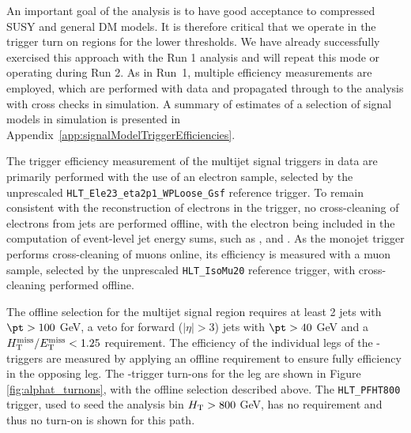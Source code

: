 An important goal of the analysis is to have good acceptance
to compressed SUSY and general DM models. It is therefore critical
that we operate in the trigger turn on regions for the lower
thresholds. We have already successfully exercised this approach with 
the Run 1 analysis and will repeat this mode or operating during Run 2.
As in Run~1, multiple efficiency measurements are
employed, which are performed with data and propagated through to the
analysis with cross checks in simulation. A summary of estimates of a 
selection of signal models in simulation is presented in Appendix~\ref{app:signalModelTriggerEfficiencies}.



% 
The trigger efficiency measurement of the multijet signal triggers in data are primarily performed with the use of 
an electron sample, selected by the unprescaled \verb!HLT_Ele23_eta2p1_WPLoose_Gsf! reference trigger. 
To remain consistent with the reconstruction of electrons in the trigger, no cross-cleaning of electrons from jets 
are performed offline, with the electron being included in the computation of event-level jet energy sums, such as 
\scalht, \MHT and \alt. As the monojet trigger performs cross-cleaning of muons online, its efficiency is measured 
with a muon sample, selected by the unprescaled \verb!HLT_IsoMu20! reference trigger, with cross-cleaning performed offline.

The offline selection for the multijet signal region requires at least 2 jets with $\pt > 100$ GeV, a veto for forward ($|\eta|>3$) 
jets with $\pt > 40$ GeV 
and a $\mbox{$\mbox{$H_{\rm T}^{\rm miss}$} / \mbox{$E_\text{T}^{\rm miss}$}$} < 1.25$ requirement. The efficiency of the individual legs of the \scalht-\alphat triggers are measured 
by applying an offline requirement to ensure fully efficiency in the opposing leg. The \scalht-\alphat trigger turn-ons for the 
\alt leg are shown in Figure \ref{fig:alphat_turnons}, with the offline selection described above. The \verb!HLT_PFHT800! 
trigger, used to seed the analysis bin $\mbox{$H_\text{T}$} > 800$ GeV, 
has no \alt requirement and thus no \alt turn-on is shown for this path.

